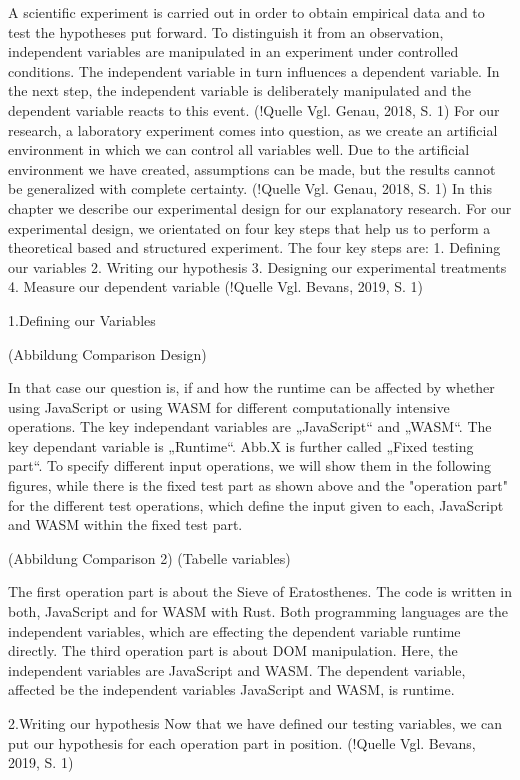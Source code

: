 A scientific experiment is carried out in order to obtain empirical data and to test the hypotheses put forward. To distinguish it from an observation, independent variables are manipulated in an experiment under controlled conditions. The independent variable in turn influences a dependent variable. In the next step, the independent variable is deliberately manipulated and the dependent variable reacts to this event. (!Quelle Vgl. Genau, 2018, S. 1)
For our research, a laboratory experiment comes into question, as we create an artificial environment in which we can control all variables well. Due to the artificial environment we have created, assumptions can be made, but the results cannot be generalized with complete certainty. (!Quelle Vgl. Genau, 2018, S. 1)
In this chapter we describe our experimental design for our explanatory research. 
For our experimental design, we orientated on four key steps that help us to perform a theoretical based and structured experiment. The four key steps are: 
1.	Defining our variables
2.	Writing our hypothesis
3.	Designing our experimental treatments
4.	Measure our dependent variable
(!Quelle Vgl. Bevans, 2019, S. 1)

1.Defining our Variables

(Abbildung Comparison Design)

In that case our question is, if and how the runtime can be affected by whether using JavaScript or using WASM for different computationally intensive operations. The key independant variables are „JavaScript“ and „WASM“. The key dependant variable is „Runtime“. Abb.X is further called „Fixed testing part“.
To specify different input operations, we will show them in the following figures, while there is the fixed test part as shown above and the "operation part" for the different test operations, which define the input given to each, JavaScript and WASM within the fixed test part.

(Abbildung Comparison 2)
(Tabelle variables)

The first operation part is about the Sieve of Eratosthenes. The code is written in both, JavaScript and for WASM with Rust. Both programming languages are the independent variables, which are effecting the dependent variable runtime directly.
The third operation part is about DOM manipulation. Here, the independent variables are JavaScript and WASM. The dependent variable, affected be the independent variables JavaScript and WASM, is runtime.

2.Writing our hypothesis
Now that we have defined our testing variables, we can put our hypothesis for each operation part in position. (!Quelle Vgl. Bevans, 2019, S. 1)


